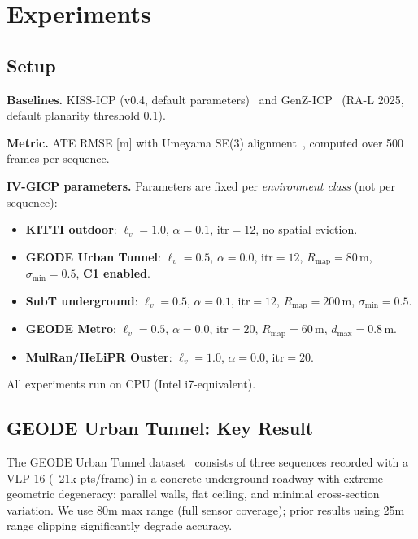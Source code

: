 \documentclass[letterpaper, 10pt, conference]{ieeeconf}
\begin{document}
\section{Experiments}\label{sec:experiments}

\subsection{Setup}

\textbf{Baselines.}
KISS-ICP (v0.4, default parameters)~\cite{vizzo2023kiss} and
GenZ-ICP~\cite{zhang2024genz} (RA-L 2025, default planarity threshold 0.1).

\textbf{Metric.}
ATE RMSE [m] with Umeyama SE(3) alignment~\cite{umeyama1991least},
computed over 500 frames per sequence.

\textbf{IV-GICP parameters.}
Parameters are fixed per \textit{environment class} (not per sequence):
\begin{itemize}
  \item \textbf{KITTI outdoor}: $\ell_v{=}1.0$, $\alpha{=}0.1$, $\mathrm{itr}{=}12$, no spatial eviction.
  \item \textbf{GEODE Urban Tunnel}: $\ell_v{=}0.5$, $\alpha{=}0.0$, $\mathrm{itr}{=}12$,
    $R_{\mathrm{map}}{=}80\,\mathrm{m}$, $\sigma_{\min}{=}0.5$, \textbf{C1 enabled}.
  \item \textbf{SubT underground}: $\ell_v{=}0.5$, $\alpha{=}0.1$, $\mathrm{itr}{=}12$,
    $R_{\mathrm{map}}{=}200\,\mathrm{m}$, $\sigma_{\min}{=}0.5$.
  \item \textbf{GEODE Metro}: $\ell_v{=}0.5$, $\alpha{=}0.0$, $\mathrm{itr}{=}20$,
    $R_{\mathrm{map}}{=}60\,\mathrm{m}$, $d_{\max}{=}0.8\,\mathrm{m}$.
  \item \textbf{MulRan/HeLiPR Ouster}: $\ell_v{=}1.0$, $\alpha{=}0.0$, $\mathrm{itr}{=}20$.
\end{itemize}
All experiments run on CPU (Intel i7-equivalent).

\subsection{GEODE Urban Tunnel: Key Result}\label{sec:geode_urban}

The GEODE Urban Tunnel dataset~\cite{shan2021geode} consists of three sequences
recorded with a VLP-16 (~21k pts/frame) in a concrete underground roadway
with extreme geometric degeneracy: parallel walls, flat ceiling, and minimal
cross-section variation.
We use 80m max range (full sensor coverage); prior results using
25m range clipping significantly degrade accuracy.
\end{document}
